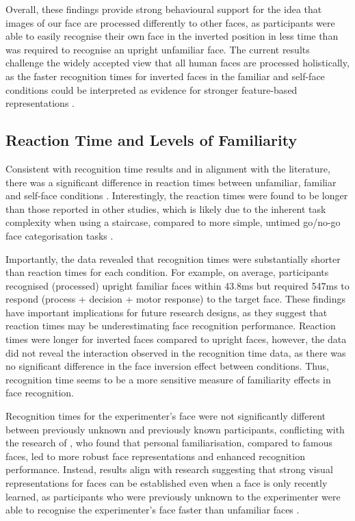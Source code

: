 \documentclass[
  10pt,
  letterpaper,
]{article}
\begin{document}
Overall, these findings provide strong behavioural support for the idea
that images of our face are processed differently to other faces, as
participants were able to easily recognise their own face in the
inverted position in less time than was required to recognise an upright
unfamiliar face. The current results challenge the widely accepted view
that all human faces are processed holistically, as the faster
recognition times for inverted faces in the familiar and self-face
conditions could be interpreted as evidence for stronger feature-based
representations \citep{gerlach2022a, tong1999a}.

\subsection{Reaction Time and Levels of
Familiarity}\label{reaction-time-and-levels-of-familiarity}

Consistent with recognition time results and in alignment with the
literature, there was a significant difference in reaction times between
unfamiliar, familiar and self-face conditions
\citep{kloth2006a, ramon2011a, young2017a}. Interestingly, the reaction
times were found to be longer than those reported in other studies,
which is likely due to the inherent task complexity when using a
staircase, compared to more simple, untimed go/no-go face categorisation
tasks \citep{bortolon2017a, burton2016a, ramon2011a, smith2016a}.

Importantly, the data revealed that recognition times were substantially
shorter than reaction times for each condition. For example, on average,
participants recognised (processed) upright familiar faces within 43.8ms
but required 547ms to respond (process + decision + motor response) to
the target face. These findings have important implications for future
research designs, as they suggest that reaction times may be
underestimating face recognition performance. Reaction times were longer
for inverted faces compared to upright faces, however, the data did not
reveal the interaction observed in the recognition time data, as there
was no significant difference in the face inversion effect between
conditions. Thus, recognition time seems to be a more sensitive measure
of familiarity effects in face recognition.

Recognition times for the experimenter's face were not significantly
different between previously unknown and previously known participants,
conflicting with the research of \citet{ambrus2021a}, who found that
personal familiarisation, compared to famous faces, led to more robust
face representations and enhanced recognition performance. Instead,
results align with research suggesting that strong visual
representations for faces can be established even when a face is only
recently learned, as participants who were previously unknown to the
experimenter were able to recognise the experimenter's face faster than
unfamiliar faces \citep{dowsett2016a, kramer2018a, murphy2015a}.
\end{document}
